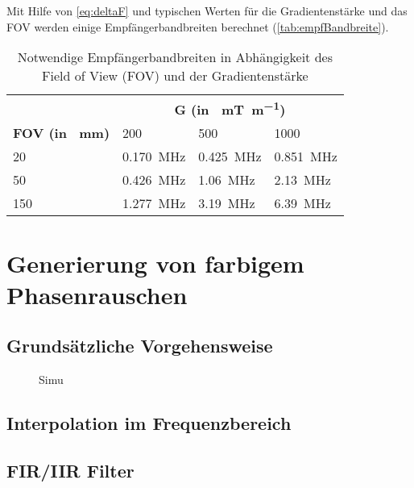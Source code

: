 Mit Hilfe von \autoref{eq:deltaF} und typischen Werten für die Gradientenstärke und das FOV werden einige Empfängerbandbreiten berechnet (\autoref{tab:empfBandbreite}).

\begin{table}[H]
	\centering
	\caption{Notwendige Empfängerbandbreiten in Abhängigkeit des Field of View (FOV) und der Gradientenstärke}
	\label{tab:empfBandbreite}
	\begin{tabular}{llll}
		\toprule
		& \multicolumn{3}{c}{\textbf{G (in \SI{}{\milli\tesla\per\meter})}} \\ \cmidrule{2-4}
		\textbf{FOV (in \SI{}{\mm})}& 200 & 500 & 1000 \\
		20 & \SI{0.170}{\mega\hertz} & \SI{0.425}{\mega\hertz} & \SI{0.851}{\mega\hertz} \\
		50 & \SI{0.426}{\mega\hertz} & \SI{1.06}{\mega\hertz} & \SI{2.13}{\mega\hertz} \\
		150 & \SI{1.277}{\mega\hertz} & \SI{3.19}{\mega\hertz} & \SI{6.39}{\mega\hertz} \\
		\bottomrule
	\end{tabular}
\end{table}

\section{Generierung von farbigem Phasenrauschen}

\subsection{Grundsätzliche Vorgehensweise}


\begin{figure}[H]
	\centering
	\caption[Simulation]{Simu}
	\label{fig:aaa}
\end{figure}


\subsection{Interpolation im Frequenzbereich}

\subsection{FIR/IIR Filter}

